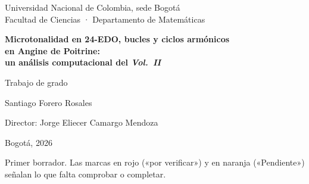 \documentclass[11pt,a4paper,oneside]{report}
\theoremstyle{definition}
\begin{document}
\begin{titlepage}
  \centering
  {\large Universidad Nacional de Colombia, sede Bogotá\\
  Facultad de Ciencias · Departamento de Matemáticas\par}
  \vspace{3cm}
  {\LARGE\bfseries Microtonalidad en 24-EDO, bucles y ciclos armónicos\\[0.3em]
  en Angine de Poitrine:\\[0.3em] un análisis computacional del \emph{Vol.~II}\par}
  \vspace{1.5cm}
  {\large Trabajo de grado\par}
  \vspace{2cm}
  {\large Santiago Forero Rosales\par}
  \vspace{0.8cm}
  {\normalsize Director: Jorge Eliecer Camargo Mendoza\par}
  \vfill
  {\normalsize Bogotá, 2026\par}
  \vspace{0.5cm}
  {\small\textcolor{red!70!black}{Primer borrador. Las marcas en rojo («por verificar») y en naranja («Pendiente») señalan lo que falta comprobar o completar.}\par}
\end{titlepage}



\tableofcontents
\listoffigures
\listoftables

\cleardoublepage
{}












\appendix





\end{document}

